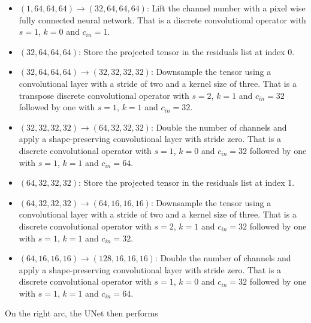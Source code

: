 \documentclass{article}
\begin{document}
\begin{itemize}
    \item $(1, 64, 64, 64) \rightarrow (32, 64, 64, 64)$: Lift the channel number with a pixel wise fully connected neural network. That is a discrete convolutional operator with $s=1$, $k=0$ and $c_{in}=1$.
    
    \item $(32, 64, 64, 64)$: Store the projected tensor in the residuals list at index 0.
    
    \item $(32, 64, 64, 64) \rightarrow (32, 32, 32, 32)$: Downsample the tensor using a convolutional layer with a stride of two and a kernel size of three. That is a transpose discrete convolutional operator with $s=2$, $k=1$ and $c_{in} = 32$ followed by one with $s=1$, $k=1$ and $c_{in} = 32$.
    
    \item $(32, 32, 32, 32) \rightarrow (64, 32, 32, 32)$: Double the number of channels and apply a shape-preserving convolutional layer with stride zero. That is a discrete convolutional operator with $s=1$, $k=0$ and $c_{in} = 32$ followed by one with $s=1$, $k=1$ and $c_{in} = 64$.
    
    \item $(64, 32, 32, 32)$: Store the projected tensor in the residuals list at index 1.
    
    \item $(64, 32, 32, 32) \rightarrow (64, 16, 16, 16)$: Downsample the tensor using a convolutional layer with a stride of two and a kernel size of three. That is a discrete convolutional operator with $s=2$, $k=1$ and $c_{in} = 32$ followed by one with $s=1$, $k=1$ and $c_{in} = 32$.
    
    \item $(64, 16, 16, 16) \rightarrow (128, 16, 16, 16)$: Double the number of channels and apply a shape-preserving convolutional layer with stride zero. That is a discrete convolutional operator with $s=1$, $k=0$ and $c_{in} = 32$ followed by one with $s=1$, $k=1$ and $c_{in} = 64$.
\end{itemize}

On the right arc, the UNet then performs
\end{document}
